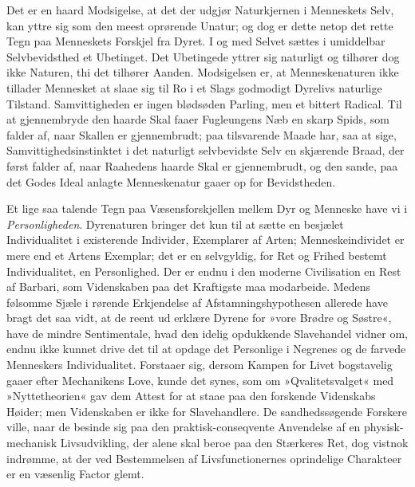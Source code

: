 \documentclass[12pt]{book}
\newcommand{\apage}[1]{\marginnote{\footnotesize\textit{[#1]}}}
\begin{document}
Det er en haard Modsigelse, at det der udgjør Naturkjernen i Menneskets
Selv, kan yttre sig som den meest oprørende Unatur; og dog er dette netop
det rette Tegn paa Menneskets Forskjel fra Dyret. I og med Selvet sættes i
umiddelbar Selvbevidsthed et Ubetinget. Det Ubetingede yttrer sig naturligt
og tilhører dog ikke Naturen, thi det tilhører Aanden. Modsigelsen er, at
Menneskenaturen ikke tillader Mennesket \apage{214} at slaae sig til Ro i et Slags
godmodigt Dyrelivs naturlige Tilstand. Samvittigheden er ingen blødsøden
Parling, men et bittert Radical. Til at gjennembryde den haarde Skal faaer
Fugleungens Næb en skarp Spids, som falder af, naar Skallen er gjennembrudt;
paa tilsvarende Maade har, saa at sige, Samvittighedsinstinktet i det
naturligt selvbevidste Selv en skjærende Braad, der først falder af, naar
Raahedens haarde Skal er gjennembrudt, og den sande, paa det Godes Ideal
anlagte Menneskenatur gaaer op for Bevidstheden.

Et lige saa talende Tegn paa Væsensforskjellen mellem Dyr og Menneske have
vi i \emph{Personligheden}. Dyrenaturen bringer det kun til at sætte en besjælet
Individualitet i existerende Individer, Exemplarer af Arten;
Menneskeindividet er mere end et Artens Exemplar; det er en selvgyldig, for
Ret og Frihed bestemt Individualitet, en Personlighed. Der er endnu i den
moderne Civilisation en Rest af Barbari, som Videnskaben paa det
Kraftigste maa modarbeide. Medens følsomme Sjæle i rørende Erkjendelse af
Afstamningshypothesen allerede have bragt det saa vidt, at de reent ud
erklære Dyrene for »vore Brødre og Søstre«, have de mindre Sentimentale,
hvad den idelig opdukkende Slavehandel vidner om, endnu ikke kunnet drive
det til at opdage det Personlige i Negrenes og de farvede Menneskers
Individualitet. Forstaaer sig, dersom Kampen for Livet bogstavelig gaaer
efter Mechanikens Love, kunde det synes, som om »Qvalitetsvalget« med
»Nyttetheorien« gav dem Attest for at staae paa den forskende Videnskabs
Høider; men  \apage{215} Videnskaben er ikke for Slavehandlere. De sandhedssøgende
Forskere ville, naar de besinde sig paa den praktisk-conseqvente Anvendelse
af en physisk-mechanisk Livsudvikling, der alene skal beroe paa den
Stærkeres Ret, dog vistnok indrømme, at der ved Bestemmelsen af
Livsfunctionernes oprindelige Charakteer er en væsenlig Factor glemt.
\end{document}
